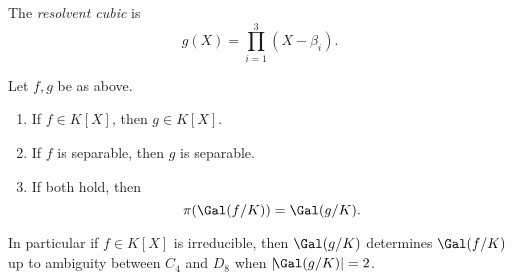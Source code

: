 \documentclass[12pt]{article}
\begin{document}
\begin{definition}
	The \emph{resolvent cubic} is
	\[
	g(X) = \prod_{i = 1}^{3}(X - \beta_i).
	\]
\end{definition}

\begin{theorem}
	Let $f, g$ be as above.
	\begin{enumerate}[\normalfont(i)]
		\item If $f \in K[X]$, then $g \in K[X]$.
		\item If $f$ is separable, then $g$ is separable.
		\item If both hold, then
			\[
			\pi(\Gal(f/K)) = \Gal(g/K).
			\]
	\end{enumerate}
	In particular if $f \in K[X]$ is irreducible, then $\Gal(g/K)$ determines $\Gal(f/K)$ up to ambiguity between $C_4$ and $D_8$ when $|\!\Gal(g/K)| = 2$.
\end{theorem}
\end{document}
